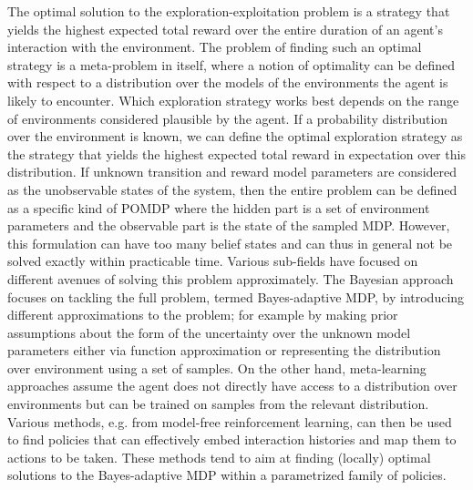 \label{sec:prior}
The optimal solution to the exploration-exploitation problem is a strategy that yields the highest expected total reward over the entire duration of an agent's interaction with the environment. The problem of finding such an optimal strategy is a meta-problem in itself, where a notion of optimality can be defined with respect to a distribution over the models of the environments the agent is likely to encounter. Which exploration strategy works best depends on the range of environments considered plausible by the agent. If a probability distribution over the environment is known, we can define the optimal exploration strategy as the strategy that yields the highest expected total reward in expectation over this distribution. 
If unknown transition and reward model parameters are considered as the unobservable states of the system, then the entire problem can be defined as a specific kind of POMDP where the hidden part is a set of environment parameters and the observable part is the state of the sampled MDP. 
However, this formulation can have too many belief states and can thus in general not be solved exactly within practicable time. 
Various sub-fields have focused on different avenues of solving this problem approximately.  
The Bayesian approach focuses on tackling the full problem, termed Bayes-adaptive MDP, by introducing different approximations to the problem; for example by making prior assumptions about the form of the uncertainty over the unknown model parameters either via function approximation or representing the distribution over environment using a set of samples. 
On the other hand, meta-learning approaches assume the agent does not directly have access to a distribution over environments but can be trained on samples from the relevant distribution. Various methods, e.g. from model-free reinforcement learning, can then be used to find policies that can effectively embed interaction histories and map them to actions to be taken. These methods tend to aim at finding (locally) optimal solutions to the Bayes-adaptive MDP within a parametrized family of policies.


